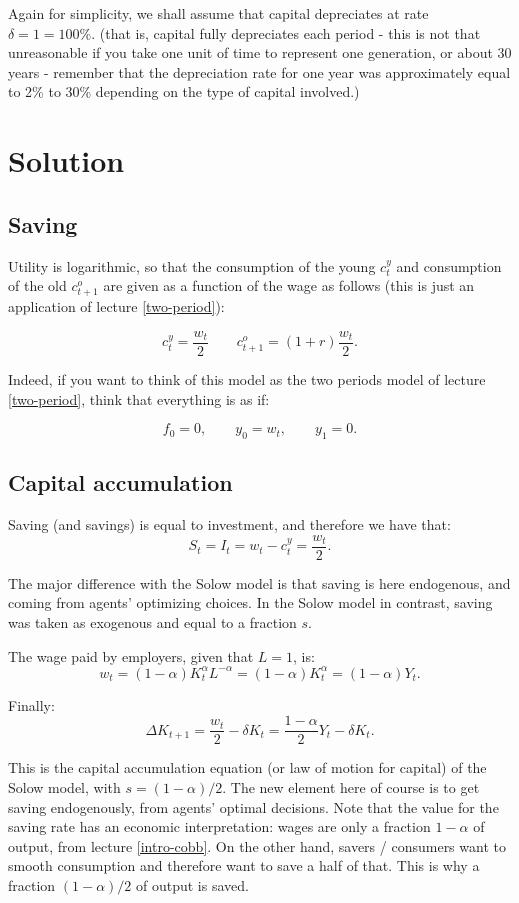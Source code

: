 \documentclass[]{book}
\begin{document}
Again for simplicity, we shall assume that capital depreciates at rate
\(\delta=1=100\%\). (that is, capital fully depreciates each period -
this is not that unreasonable if you take one unit of time to represent
one generation, or about 30 years - remember that the depreciation rate
for one year was approximately equal to 2\% to 30\% depending on the
type of capital involved.)

\section{Solution}\label{solution}

\subsection{Saving}\label{saving}

Utility is logarithmic, so that the consumption of the young
\(c_{t}^{y}\) and consumption of the old \(c_{t+1}^{o}\) are given as a
function of the wage as follows (this is just an application of lecture
\ref{two-period}):

\[c_{t}^{y}=\frac{w_{t}}{2}\qquad c_{t+1}^{o}=(1+r)\frac{w_{t}}{2}.\]

Indeed, if you want to think of this model as the two periods model of
lecture \ref{two-period}, think that everything is as if:

\[f_{0}=0,\qquad y_{0}=w_{t},\qquad y_{1}=0.\]

\subsection{Capital accumulation}\label{capital-accumulation}

Saving (and savings) is equal to investment, and therefore we have that:
\[S_t = I_t = w_{t}-c_{t}^{y}=\frac{w_{t}}{2}.\]

The major difference with the Solow model is that saving is here
endogenous, and coming from agents' optimizing choices. In the Solow
model in contrast, saving was taken as exogenous and equal to a fraction
\(s\).

The wage paid by employers, given that \(L=1\), is:
\[w_{t}=(1-\alpha)K_{t}^{\alpha}L^{-\alpha}=(1-\alpha)K_{t}^{\alpha} = (1-\alpha)Y_t.\]

Finally:
\[\Delta K_{t+1}=\frac{w_{t}}{2}-\delta K_{t} = \frac{1-\alpha}{2}Y_t-\delta K_t.\]

This is the capital accumulation equation (or law of motion for capital)
of the Solow model, with \(s = (1-\alpha)/2\). The new element here of
course is to get saving endogenously, from agents' optimal decisions.
Note that the value for the saving rate has an economic interpretation:
wages are only a fraction \(1-\alpha\) of output, from lecture
\ref{intro-cobb}. On the other hand, savers / consumers want to smooth
consumption and therefore want to save a half of that. This is why a
fraction \((1-\alpha)/2\) of output is saved.
\end{document}
